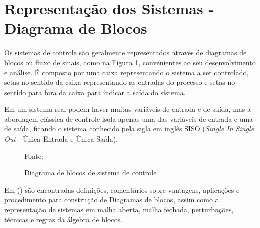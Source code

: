 
\section{Representação dos Sistemas - Diagrama de Blocos}



Os sistemas de controle são geralmente representados através de diagramas de blocos ou fluxo de sinais, como na Figura \ref{fig:AnexoAprocesso}, convenientes ao seu desenvolvimento e análise. 
É composto por uma caixa representando o sistema a ser controlado, setas no sentido da caixa representando as entradas do processo e setas no sentido para fora da caixa para indicar a saída do sistema.


Em um sistema real podem haver muitas variáveis de entrada e de saída, mas a abordagem clássica de controle isola apenas uma das variáveis de entrada e uma de saída, ficando o sistema conhecido pela sigla em inglês SISO (\emph{Single In Single Out} - Única Entrada e Única Saída).


\begin{figure}[!htb]
\centering
\caption{ Diagrama de blocos de sistema de controle}
\label{fig:AnexoAprocesso}

{\small Fonte: \cite{Ogata} }
\end{figure}




Em \citeauthor{Ogata}(\citeyear{Ogata}) %
são encontradas definições, comentários sobre vantagens, aplicações e procedimento para construção de Diagramas de blocos, assim como a representação de sistemas em malha aberta, malha fechada, perturbações, técnicas e regras da álgebra de blocos.


